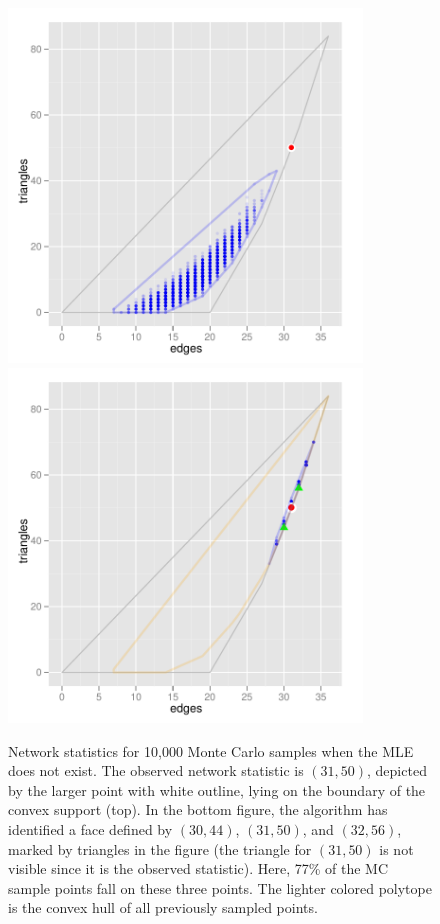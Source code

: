 \begin{figure}[!ht]
\centering
\includegraphics[width=3.7in]{Figures/MCsample-boundary}
\includegraphics[width=3.7in]{Figures/MCsample-77face}
\caption[Network statistics for 10,000 Monte Carlo samples when MLE does not exist]
{Network statistics for 10,000 Monte Carlo samples when the MLE does not exist.  
The observed network statistic is $(31,50)$, depicted by the larger point with white 
outline, lying on the boundary of the convex support (top).
In the bottom figure, the algorithm has identified a face defined by $(30,44)$, 
$(31,50)$, and $(32,56)$, marked by triangles in the figure (the triangle for 
$(31,50)$ is not visible since it is the observed statistic).  
Here, 77\% of the MC sample points fall on these three points.  The 
lighter colored polytope is the convex hull of all previously sampled points.
}
\label{F:MC face}
\end{figure}

